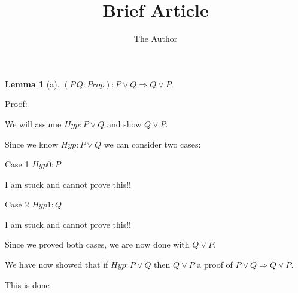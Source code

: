 \documentclass[11pt, oneside]{article}
\title{Brief Article}
\author{The Author}
\date{}							%
\newtheorem{Lemma}{Lemma}
\begin{document}
\maketitle

\begin{Lemma}[a] 
$(P\,Q:Prop):P\lor Q\Rightarrow Q\lor P.$
 \end{Lemma}


 Proof: \begin{subproof}We will assume $Hyp : P \lor Q $ and show $Q \lor P $.\begin{subproof}Since we know $Hyp : P \lor Q $ we can consider two cases: 

 Case 1 $Hyp0 : P $

 \begin{subproof}{\color{red} I am stuck and cannot prove this!!}\end{subproof} 

 Case 2 $Hyp1 : Q $

 \begin{subproof}{\color{red} I am stuck and cannot prove this!!}\end{subproof} Since we proved both cases, we are now done with $Q \lor P $.\end{subproof} We have now showed that if $Hyp : P \lor Q $ then $Q \lor P $ a proof of $P \lor Q \Rightarrow Q \lor P $.\end{subproof}This is done
\end{document}
